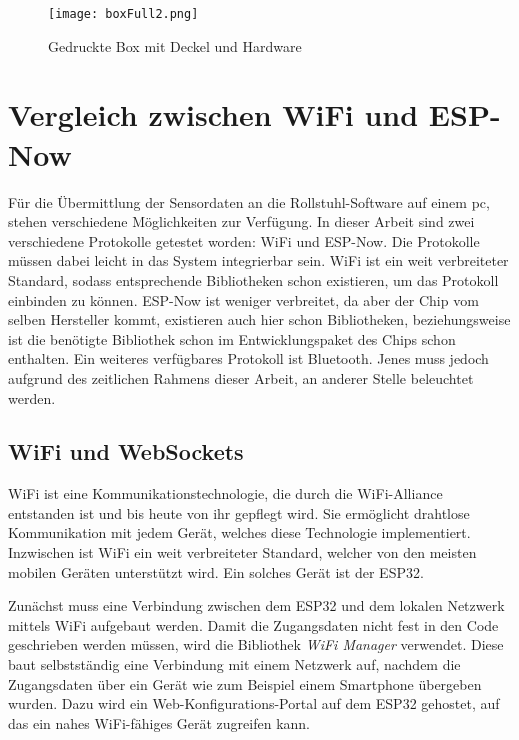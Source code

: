 \begin{figure}[h]
    \centering
    \texttt{[image: boxFull2.png]}
    \caption{Gedruckte Box mit Deckel und Hardware}
    \label{fig:gedruckteBox}
\end{figure}

\section{Vergleich zwischen WiFi und ESP-Now}
Für die Übermittlung der Sensordaten an die Rollstuhl-Software auf einem \ac{pc}, stehen verschiedene Möglichkeiten zur Verfügung.
In dieser Arbeit sind zwei verschiedene Protokolle getestet worden: WiFi und ESP-Now. Die Protokolle müssen dabei leicht in das System integrierbar sein.
WiFi ist ein weit verbreiteter Standard, sodass entsprechende Bibliotheken schon existieren, um das Protokoll einbinden zu können\cite{WiFiArduinoReference}.
ESP-Now ist weniger verbreitet, da aber der Chip vom selben Hersteller kommt, existieren auch hier schon Bibliotheken, beziehungsweise ist die benötigte Bibliothek schon im Entwicklungspaket des Chips schon enthalten\cite{EspressifIoTDevelopment2022}.
Ein weiteres verfügbares Protokoll ist Bluetooth.
Jenes muss jedoch aufgrund des zeitlichen Rahmens dieser Arbeit, an anderer Stelle beleuchtet werden.

\subsection{WiFi und WebSockets}
WiFi ist eine Kommunikationstechnologie, die durch die WiFi-Alliance entstanden ist und bis heute von ihr gepflegt wird\cite{WhoWeAre}.
Sie ermöglicht drahtlose Kommunikation mit jedem Gerät, welches diese Technologie implementiert.
Inzwischen ist WiFi ein weit verbreiteter Standard, welcher von den meisten mobilen Geräten unterstützt wird\cite{DiscoverWiFiWiFi}.
Ein solches Gerät ist der ESP32.

Zunächst muss eine Verbindung zwischen dem ESP32 und dem lokalen Netzwerk mittels WiFi aufgebaut werden.
Damit die Zugangsdaten nicht fest in den Code geschrieben werden müssen, wird die Bibliothek \textit{WiFi Manager}\cite{tzapuWiFiManager2022} verwendet.
Diese baut selbstständig eine Verbindung mit einem Netzwerk auf, nachdem die Zugangsdaten über ein Gerät wie zum Beispiel einem Smartphone übergeben wurden.
Dazu wird ein Web-Konfigurations-Portal auf dem ESP32 gehostet, auf das ein nahes WiFi-fähiges Gerät zugreifen kann.

